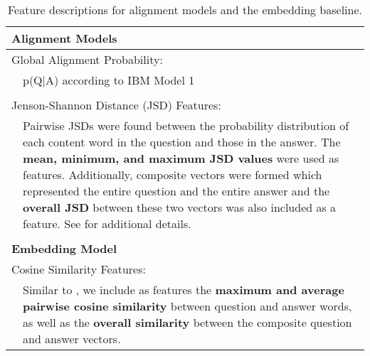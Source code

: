 

\begin{table*}[t]{}
        \centering
        \begin{tabular}{p{1cm}p{10cm}}
		\hline        
        \multicolumn{2}{l}{\bf Alignment Models} \\
        \hline
        \multicolumn{2}{l}{Global Alignment Probability:} \\
		  &  p(Q$|$A) according to IBM Model 1 \citep{Brown:93} \\ 
		\\        
        \multicolumn{2}{l}{Jenson-Shannon Distance (JSD) Features:} \\         
         {  } & {Pairwise JSDs were found between the probability distribution of each content word in the question and those in the answer.  The \textbf{mean, minimum, and maximum JSD values} were used as features. Additionally, composite vectors were formed which represented the entire question and the entire answer and the \textbf{overall JSD} between these two vectors was also included as a feature. See \citet{fried2015higher} for additional details.} \\
		\\        
        \hline
		 \multicolumn{2}{l}{\bf Embedding Model} \\
		 \hline
		 \multicolumn{2}{l}{Cosine Similarity Features:} \\        
         {  } & {Similar to \citet{jansen14}, we include as features the {\bf maximum and average pairwise cosine similarity} between question and answer words, as well as the {\bf overall similarity} between the composite question and answer vectors.} \\
        \end{tabular}
        \caption{Feature descriptions for alignment models and the embedding baseline.}
        \label{tab:Features}
	
\end{table*}

